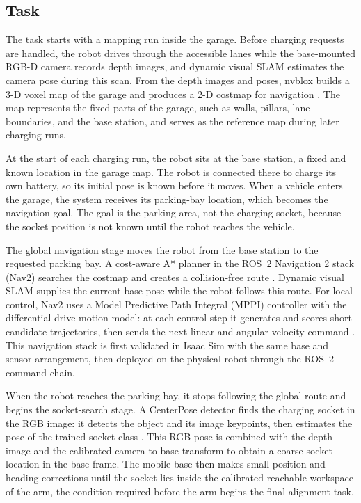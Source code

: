 \documentclass[10pt]{article}
\begin{document}
\subsection{Task}
\label{sec:task}

The task starts with a mapping run inside the garage. Before charging requests are handled, the robot drives through the accessible lanes while the base-mounted RGB-D camera records depth images, and dynamic visual SLAM estimates the camera pose during this scan. From the depth images and poses, nvblox builds a 3-D voxel map of the garage and produces a 2-D costmap for navigation \cite{millane2024nvblox,nvidia_nvblox}. The map represents the fixed parts of the garage, such as walls, pillars, lane boundaries, and the base station, and serves as the reference map during later charging runs.

At the start of each charging run, the robot sits at the base station, a fixed and known location in the garage map. The robot is connected there to charge its own battery, so its initial pose is known before it moves. When a vehicle enters the garage, the system receives its parking-bay location, which becomes the navigation goal. The goal is the parking area, not the charging socket, because the socket position is not known until the robot reaches the vehicle.

The global navigation stage moves the robot from the base station to the requested parking bay. A cost-aware A* planner in the ROS~2 Navigation 2 stack (Nav2) searches the costmap and creates a collision-free route \cite{nav2_smac}. Dynamic visual SLAM supplies the current base pose while the robot follows this route. For local control, Nav2 uses a Model Predictive Path Integral (MPPI) controller with the differential-drive motion model: at each control step it generates and scores short candidate trajectories, then sends the next linear and angular velocity command \cite{nav2_mppi}. This navigation stack is first validated in Isaac Sim with the same base and sensor arrangement, then deployed on the physical robot through the ROS~2 command chain.

When the robot reaches the parking bay, it stops following the global route and begins the socket-search stage. A CenterPose detector finds the charging socket in the RGB image: it detects the object and its image keypoints, then estimates the pose of the trained socket class \cite{lin2022centerpose}. This RGB pose is combined with the depth image and the calibrated camera-to-base transform to obtain a coarse socket location in the base frame. The mobile base then makes small position and heading corrections until the socket lies inside the calibrated reachable workspace of the arm, the condition required before the arm begins the final alignment task.
\end{document}
